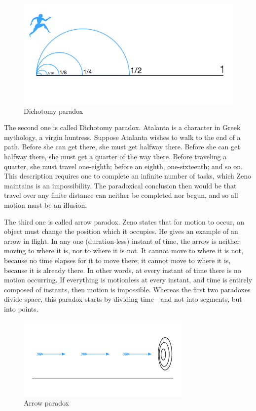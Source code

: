 \documentclass{article}
\begin{document}
\begin{figure}[htbp]
 \centering
 \includegraphics[scale=0.4]{img/Dichotomy-paradox.png}
 \caption{Dichotomy paradox}
 \label{fig:Dichotomy-paradox}
\end{figure}

The second one is called Dichotomy paradox. Atalanta is a character in Greek mythology, a virgin huntress. Suppose Atalanta wishes to walk to the end of a path. Before she can get there, she must get halfway there. Before she can get halfway there, she must get a quarter of the way there. Before traveling a quarter, she must travel one-eighth; before an eighth, one-sixteenth; and so on. This description requires one to complete an infinite number of tasks, which Zeno maintains is an impossibility. The paradoxical conclusion then would be that travel over any finite distance can neither be completed nor begun, and so all motion must be an illusion.

The third one is called arrow paradox. Zeno states that for motion to occur, an object must change the position which it occupies. He gives an example of an arrow in flight. In any one (duration-less) instant of time, the arrow is neither moving to where it is, nor to where it is not. It cannot move to where it is not, because no time elapses for it to move there; it cannot move to where it is, because it is already there. In other words, at every instant of time there is no motion occurring. If everything is motionless at every instant, and time is entirely composed of instants, then motion is impossible. Whereas the first two paradoxes divide space, this paradox starts by dividing time—and not into segments, but into points.

\begin{figure}[htbp]
 \centering
 \includegraphics[scale=0.4]{img/Arrow-paradox.png}
 \caption{Arrow paradox}
 \label{fig:Arrow-paradox}
\end{figure}
\end{document}
